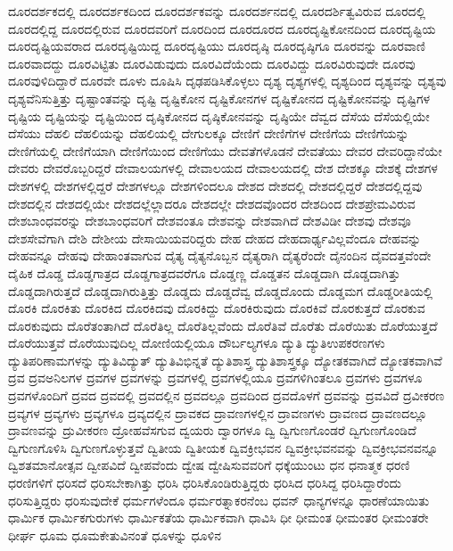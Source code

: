 {ದೂರದರ್ಶಕದಲ್ಲಿ
ದೂರದರ್ಶಕದಿಂದ
ದೂರದರ್ಶಕವನ್ನು
ದೂರದರ್ಶನದಲ್ಲಿ
ದೂರದರ್ಶಿತ್ವವಿರುವ
ದೂರದಲ್ಲಿ
ದೂರದಲ್ಲಿದ್ದ
ದೂರದಲ್ಲಿರುವ
ದೂರದವರಿಗೆ
ದೂರದಿಂದ
ದೂರದೂರದ
ದೂರದೃಷ್ಟಿಕೋನದಿಂದ
ದೂರದೃಷ್ಟಿಯ
ದೂರದೃಷ್ಟಿಯವರಾದ
ದೂರದೃಷ್ಟಿಯಿದ್ದ
ದೂರದೃಷ್ಟಿಯು
ದೂರದೃಷ್ಠಿ
ದೂರದೃಷ್ಠಿಗೂ
ದೂರವನ್ನು
ದೂರವಾಣಿ
ದೂರವಾದದ್ದು
ದೂರವಿಟ್ಟಿತು
ದೂರವಿಡುವುದು
ದೂರವಿದೆಯೆಂದು
ದೂರವಿದ್ದು
ದೂರವಿರುವುದೇ
ದೂರವು
ದೂರವುಳಿದಿದ್ದಾರೆ
ದೂರವೇ
ದೂಳು
ದೂಷಿಸಿ
ದೃಢಪಡಿಸಿಕೊಳ್ಳಲು
ದೃಶ್ಯ
ದೃಶ್ಯಗಳಲ್ಲಿ
ದೃಶ್ಯದಿಂದ
ದೃಶ್ಯವನ್ನು
ದೃಶ್ಯವು
ದೃಶ್ಯವೆನಿಸುತ್ತಿತ್ತು
ದೃಷ್ಟಾಂತವನ್ನು
ದೃಷ್ಟಿ
ದೃಷ್ಟಿಕೋನ
ದೃಷ್ಟಿಕೋನಗಳ
ದೃಷ್ಟಿಕೋನದ
ದೃಷ್ಟಿಕೋನವನ್ನು
ದೃಷ್ಟಿಗಳ
ದೃಷ್ಟಿಯ
ದೃಷ್ಟಿಯನ್ನು
ದೃಷ್ಟಿಯಿಂದ
ದೃಷ್ಠಿಕೋನದ
ದೃಷ್ಠಿಕೋನವನ್ನು
ದೃಷ್ಠಿಯೇ
ದೆವ್ವದ
ದೆಸೆಯ
ದೆಸೆಯಲ್ಲಿಯೇ
ದೆಸೆಯು
ದೆಹಲಿ
ದೆಹಲಿಯನ್ನು
ದೆಹಲಿಯಲ್ಲಿ
ದೇಗುಲಕ್ಕೂ
ದೇಣಿಗೆ
ದೇಣಿಗೆಗಳ
ದೇಣಿಗೆಯ
ದೇಣಿಗೆಯನ್ನು
ದೇಣಿಗೆಯಲ್ಲಿ
ದೇಣಿಗೆಯಾಗಿ
ದೇಣಿಗೆಯಿಂದ
ದೇಣಿಗೆಯು
ದೇವತೆಗಳೊಡನೆ
ದೇವತೆಯು
ದೇವರ
ದೇವರಿದ್ದಾನೆಯೇ
ದೇವರು
ದೇವರೊಬ್ಬರಿದ್ದರೆ
ದೇವಾಲಯಗಳಲ್ಲಿ
ದೇವಾಲಯದ
ದೇವಾಲಯದಲ್ಲಿ
ದೇಶ
ದೇಶಕ್ಕೂ
ದೇಶಕ್ಕೆ
ದೇಶಗಳ
ದೇಶಗಳಲ್ಲಿ
ದೇಶಗಳಲ್ಲಿದ್ದರೆ
ದೇಶಗಳಲ್ಲೂ
ದೇಶಗಳಿಂದಲೂ
ದೇಶದ
ದೇಶದಲ್ಲಿ
ದೇಶದಲ್ಲಿದ್ದರೆ
ದೇಶದಲ್ಲಿದ್ದವು
ದೇಶದಲ್ಲಿನ
ದೇಶದಲ್ಲಿಯೇ
ದೇಶದಲ್ಲೆಲ್ಲಾದರೂ
ದೇಶದಲ್ಲೇ
ದೇಶದವೊಂದರ
ದೇಶದಿಂದ
ದೇಶಪ್ರೇಮವಿರುವ
ದೇಶಬಾಂಧವರನ್ನು
ದೇಶಬಾಂಧವರಿಗೆ
ದೇಶವಂತೂ
ದೇಶವನ್ನು
ದೇಶವಾಗಿದೆ
ದೇಶವಿಡೀ
ದೇಶವು
ದೇಶವೂ
ದೇಶಸೇವೆಗಾಗಿ
ದೇಶಿ
ದೇಶೀಯ
ದೇಸಾಯಿಯವರಿದ್ದರು
ದೇಹ
ದೇಹದ
ದೇಹದಾರ್ಢ್ಯವಿಲ್ಲವೆಂದೂ
ದೇಹವನ್ನು
ದೇಹವನ್ನೂ
ದೇಹವು
ದೇಹಾಂತವಾಗುವ
ದೈತ್ಯ
ದೈತ್ಯನೊಬ್ಬನ
ದೈತ್ಯರಾಗಿ
ದೈತ್ಯರೆಂದೇ
ದೈನಂದಿನ
ದೈವದತ್ತವೆಂದೇ
ದೈಹಿಕ
ದೊಡ್ಡ
ದೊಡ್ಡಗಾತ್ರದ
ದೊಡ್ಡಗಾತ್ರದವರೆಗೂ
ದೊಡ್ಡಣ್ಣ
ದೊಡ್ಡತನ
ದೊಡ್ಡದಾಗಿ
ದೊಡ್ಡದಾಗಿತ್ತು
ದೊಡ್ಡದಾಗಿರುತ್ತದೆ
ದೊಡ್ಡದಾಗಿರುತ್ತಿತ್ತು
ದೊಡ್ಡದು
ದೊಡ್ಡದೆವ್ವ
ದೊಡ್ಡದೊಂದು
ದೊಡ್ಡಮಗ
ದೊಡ್ಡರೀತಿಯಲ್ಲಿ
ದೊರಕಿ
ದೊರಕಿತು
ದೊರಕಿದ
ದೊರಕಿದವು
ದೊರಕಿದ್ದು
ದೊರಕಿರುವುದು
ದೊರಕಿವೆ
ದೊರಕುತ್ತದೆ
ದೊರಕುವ
ದೊರಕುವುದು
ದೊರೆತಂತಾಗಿದೆ
ದೊರೆತಿಲ್ಲ
ದೊರೆತಿಲ್ಲವೆಂದು
ದೊರೆತಿವೆ
ದೊರೆತು
ದೊರೆಯಿತು
ದೊರೆಯುತ್ತದೆ
ದೊರೆಯುತ್ತವೆ
ದೊರೆಯುವುದಿಲ್ಲ
ದೋಣಿಯಲ್ಲಿಯೂ
ದೌರ್ಬಲ್ಯಗಳೂ
ದ್ಯುತಿ
ದ್ಯುತಿಉಪಕರಣಗಳು
ದ್ಯುತಿಪರಿಣಾಮಗಳನ್ನು
ದ್ಯುತಿವಿದ್ಯುತ್
ದ್ಯುತಿವಿಭಿನ್ನತೆ
ದ್ಯುತಿಶಾಸ್ತ್ರ
ದ್ಯುತಿಶಾಸ್ತ್ರಕ್ಕೂ
ದ್ಯೋತಕವಾಗಿದೆ
ದ್ಯೋತಕವಾಗಿವೆ
ದ್ರವ
ದ್ರವಅನಿಲಗಳ
ದ್ರವಗಳ
ದ್ರವಗಳನ್ನು
ದ್ರವಗಳಲ್ಲಿ
ದ್ರವಗಳಲ್ಲಿಯೂ
ದ್ರವಗಳಿಗಿಂತಲೂ
ದ್ರವಗಳು
ದ್ರವಗಳೂ
ದ್ರವಗಳೊಂದಿಗೆ
ದ್ರವದ
ದ್ರವದಲ್ಲಿ
ದ್ರವದಲ್ಲಿನ
ದ್ರವದಲ್ಲೂ
ದ್ರವದಿಂದ
ದ್ರವದೊಳಗೆ
ದ್ರವವನ್ನು
ದ್ರವವಿದೆ
ದ್ರವೀಕರಣ
ದ್ರವ್ಯಗಳ
ದ್ರವ್ಯಗಳು
ದ್ರವ್ಯಗಳೂ
ದ್ರವ್ಯದಲ್ಲಿನ
ದ್ರಾವಕದ
ದ್ರಾವಣಗಳಲ್ಲಿನ
ದ್ರಾವಣಗಳು
ದ್ರಾವಣದ
ದ್ರಾವಣದಲ್ಲೂ
ದ್ರಾವಣವನ್ನು
ದ್ರುವೀಕರಣ
ದ್ರೋಹವೆಸಗುವ
ದ್ವಯರು
ದ್ವಾರಗಳೂ
ದ್ವಿ
ದ್ವಿಗುಣಗೊಂಡರೆ
ದ್ವಿಗುಣಗೊಂಡಿದೆ
ದ್ವಿಗುಣಗೊಳಿಸಿ
ದ್ವಿಗುಣಗೊಳ್ಳುತ್ತವೆ
ದ್ವಿತೀಯ
ದ್ವಿತೀಯಕ
ದ್ವಿವಕ್ರೀಭವನ
ದ್ವಿವಕ್ರೀಭವನವನ್ನು
ದ್ವಿವಕ್ರೀಭವನವನ್ನೂ
ದ್ವಿಶತಮಾನೋತ್ಸವ
ದ್ವೀಪವಿದೆ
ದ್ವೀಪವೆಂದು
ದ್ವೇಷ
ದ್ವೇಷಿಸುವವರಿಗೆ
ಧಕ್ಕೆಯುಂಟು
ಧನ
ಧನಾತ್ಮಕ
ಧರಣಿ
ಧರಣಿಗಳಿಗೆ
ಧರಿಸದೆ
ಧರಿಸಬೇಕಾಗಿತ್ತು
ಧರಿಸಿ
ಧರಿಸಿಕೊಂಡಿರುತ್ತಿದ್ದರು
ಧರಿಸಿದ
ಧರಿಸಿದ್ದ
ಧರಿಸಿದ್ದಾರೆಂದು
ಧರಿಸುತ್ತಿದ್ದರು
ಧರಿಸುವುದೇಕೆ
ಧರ್ಮಗಳೆಂದೂ
ಧರ್ಮರತ್ನಾಕರನೆಂಬ
ಧವನ್
ಧಾನ್ಯಗಳನ್ನೂ
ಧಾರಣೆಯಾಯಿತು
ಧಾರ್ಮಿಕ
ಧಾರ್ಮಿಕಗುರುಗಳು
ಧಾರ್ಮಿಕತೆಯ
ಧಾರ್ಮಿಕವಾಗಿ
ಧಾವಿಸಿ
ಧೀ
ಧೀಮಂತ
ಧೀಮಂತರ
ಧೀಮಂತರೇ
ಧೀರ್ಘ
ಧೂಮ
ಧೂಮಕೇತುವಿನಂತೆ
ಧೂಳನ್ನು
ಧೂಳಿನ
}
